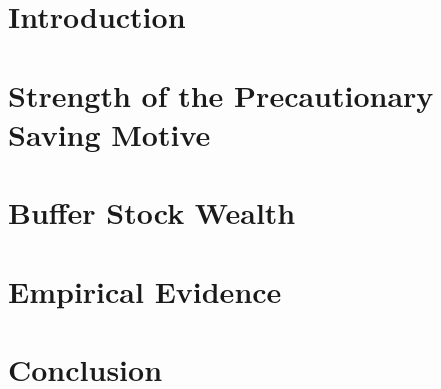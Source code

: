 \documentclass[12pt,letterpaper]{econtex}
\begin{document}
\pagebreak

\section{Introduction}\label{sec:Intro}



\section{Strength of the Precautionary Saving Motive}\label{sec:Strength}



\section{Buffer Stock Wealth}\label{sec:BufferStockWealth}



\section{Empirical Evidence}\label{sec:EmpiricalEvidence}



\section{Conclusion}\label{sec:Conclusion}



\pagebreak


\end{document}
